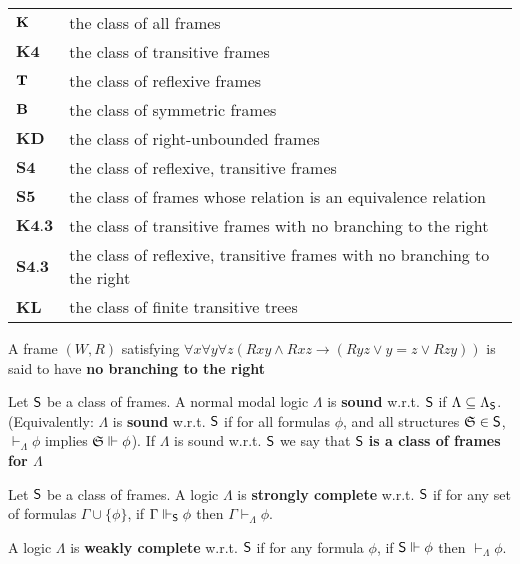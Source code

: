 \documentclass[11pt]{article}
\newcommand{\KL}{\textbf{KL}}
\newcommand{\KD}{\textbf{KD}}
\newcommand{\KF}{\textbf{K4}}
\begin{document}
\begin{center}
\begin{tabular}{ll}
\hline
\(\operatorname{\textbf{K}}\) & the class of all frames\\
\(\KF\) & the class of transitive frames\\
\(\operatorname{\textbf{T}}\) & the class of reflexive frames\\
\(\operatorname{\textbf{B}}\) & the class of symmetric frames\\
\(\KD\) & the class of right-unbounded frames\\
\(\textbf{S4}\) & the class of reflexive, transitive frames\\
\(\textbf{S5}\) & the class of frames whose relation is an equivalence relation\\
\(\textbf{K4.3}\) & the class of transitive frames with no branching to the right\\
\(\textbf{S4.3}\) & the class of reflexive, transitive frames with no branching to the right\\
\(\KL\) & the class of finite transitive trees\\
\hline
\end{tabular}
\end{center}

A frame \((W,R)\) satisfying \(\forall x\forall y\forall z(Rxy\wedge Rxz\to
   (Ryz\vee y=z\vee Rzy))\) is said to have \textbf{no branching to the right}

\begin{definition}[Soundness]
Let \(\textsf{S}\) be a class of frames. A normal modal logic \(\Lambda\) is \textbf{sound} w.r.t.
\(\textsf{S}\) if \(\Lambda\subseteq\Lambda_{\textsf{S}}\). (Equivalently: \(\Lambda\) is \textbf{sound}
w.r.t. \(\textsf{S}\) if for all formulas \(\phi\), and all structures \(\mathfrak{S}\in\textsf{S}\),
\(\vdash_\Lambda\phi\) implies \(\mathfrak{S}\Vdash\phi\)). If \(\Lambda\) is sound w.r.t.
\(\textsf{S}\) we say that \(\textsf{S}\) \textbf{is a class of frames for \(\Lambda\)}
\end{definition}


\begin{definition}[Completeness]
Let \(\textsf{S}\) be a class of frames. A logic \(\Lambda\) is \textbf{strongly complete} w.r.t.
\(\textsf{S}\) if for any set of formulas \(\Gamma\cup\{\phi\}\), if
\(\Gamma\Vdash_{\textsf{S}}\phi\) then \(\Gamma\vdash_\Lambda\phi\).

A logic \(\Lambda\) is \textbf{weakly complete} w.r.t. \(\textsf{S}\) if for any formula \(\phi\), if
\(\textsf{S}\Vdash\phi\) then \(\vdash_\Lambda\phi\).
\end{definition}
\end{document}
